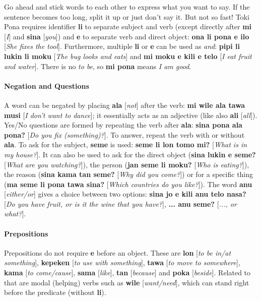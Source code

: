 \documentclass[10pt,a4paper]{article}
\begin{document}
\begin{multicols}{2}
Go ahead and stick words to each other to express what you want to say. If the sentence becomes too long, split it up or just don't say it. But not so fast! Toki Pona requires identifier \textbf{li} to separate subject and verb (except directly after \textbf{mi} [\textit{I}] and \textbf{sina} [\textit{you}]) and \textbf{e} to separate verb and direct object: \textbf{ona li pona e ilo} [\textit{She fixes the tool}]. Furthermore, multiple \textbf{li} or \textbf{e} can be used as \textit{and}: \textbf{pipi li lukin li moku} [\textit{The bug looks and eats}] and \textbf{mi moku e kili e telo} [\textit{I eat fruit and water}]. There is no \textit{to be}, so \textbf{mi pona} means \textit{I am good}.

\paragraph{Negation and Questions}

A word can be negated by placing \textbf{ala} [\textit{not}] after the verb: \textbf{mi wile ala tawa musi} [\textit{I don't want to dance}]; it essentially acts as an adjective (like also \textbf{ali} [\textit{all}]). Yes/No questions are formed by repeating the verb after \textbf{ala}: \textbf{sina pona ala pona?} [\textit{Do you fix (something)?}]. To answer, repeat the verb with or without \textbf{ala}. To ask for the subject, \textbf{seme} is used: \textbf{seme li lon tomo mi?} [\textit{What is in my house?}]. It can also be used to ask for the direct object (\textbf{sina lukin e seme?} [\textit{What are you watching?}]), the person (\textbf{jan seme li moku?} [\textit{Who is eating?}]), the reason (\textbf{sina kama tan seme?} [\textit{Why did you come?}]) or for a specific thing (\textbf{ma seme li pona tawa sina?} [\textit{Which countries do you like?}]). The word \textbf{anu} [\textit{either/or}] gives a choice between two options: \textbf{sina jo e kili anu telo nasa?} [\textit{Do you have fruit, or is it the wine that you have?}], \textbf{... anu seme?} [\textit{..., or what?}].
\end{multicols}

\paragraph{Prepositions}

Prepositions do not require \textbf{e} before an object. These are \textbf{lon} [\textit{to be in/at something}], \textbf{kepeken} [\textit{to use with something}], \textbf{tawa} [\textit{to move to somewhere}], \textbf{kama} [\textit{to come/cause}], \textbf{sama} [\textit{like}], \textbf{tan} [\textit{because}] and \textbf{poka} [\textit{beside}]. Related to that are modal (helping) verbs such as \textbf{wile} [\textit{want/need}], which can stand right before the predicate (without \textbf{li}). 
\end{document}
